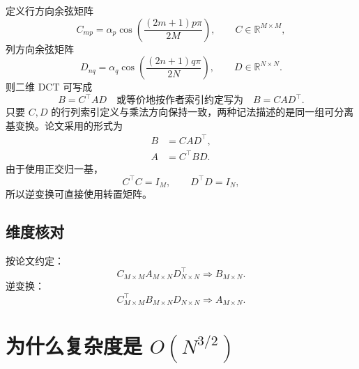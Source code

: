 \documentclass[UTF8,12pt,a4paper,fontset=none]{ctexart}
\numberwithin{equation}{section}
\newcommand{\R}{\mathbb{R}}
\begin{document}
定义行方向余弦矩阵
\begin{equation}
  C_{mp}
  =\alpha_p
  \cos\left(\frac{(2m+1)p\pi}{2M}\right),
  \qquad C\in\R^{M\times M},
\end{equation}
列方向余弦矩阵
\begin{equation}
  D_{nq}
  =\alpha_q
  \cos\left(\frac{(2n+1)q\pi}{2N}\right),
  \qquad D\in\R^{N\times N}.
\end{equation}
则二维 DCT 可写成
\begin{equation}
  B=C^{\top}AD
  \quad\text{或等价地按作者索引约定写为}\quad
  B=CAD^{\top}.
  \label{eq:matrix-convention}
\end{equation}
只要 $C,D$ 的行列索引定义与乘法方向保持一致，两种记法描述的是同一组可分离基变换。论文采用的形式为
\begin{align}
  B&=CAD^{\top},\\
  A&=C^{\top}BD.
  \tag{11}
  \label{eq:paper11}
\end{align}
由于使用正交归一基，
\begin{equation}
  C^{\top}C=I_M,
  \qquad D^{\top}D=I_N,
\end{equation}
所以逆变换可直接使用转置矩阵。

\subsection{维度核对}

按论文约定：
\begin{equation}
  C_{M\times M}
  A_{M\times N}
  D^{\top}_{N\times N}
  \Longrightarrow
  B_{M\times N}.
\end{equation}
逆变换：
\begin{equation}
  C^{\top}_{M\times M}
  B_{M\times N}
  D_{N\times N}
  \Longrightarrow
  A_{M\times N}.
\end{equation}

\section{为什么复杂度是 \texorpdfstring{$O(N^{3/2})$}{O(N to the three halves)}}
\end{document}

